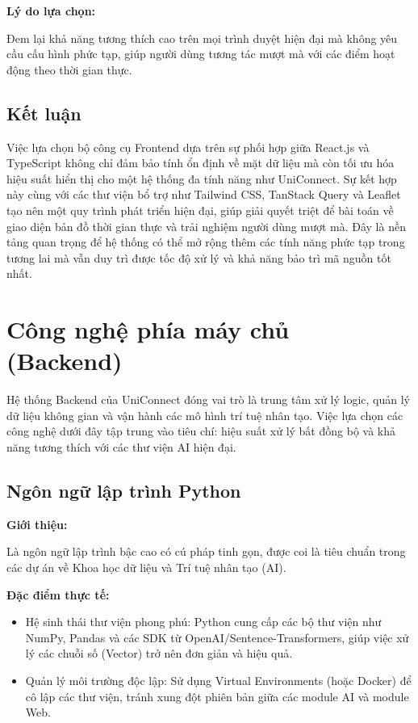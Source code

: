 \textbf{Lý do lựa chọn:}

Đem lại khả năng tương thích cao trên mọi trình duyệt hiện đại mà không yêu cầu cấu hình phức tạp, giúp người dùng tương tác mượt mà với các điểm hoạt động theo thời gian thực.

\subsection{Kết luận}

Việc lựa chọn bộ công cụ Frontend dựa trên sự phối hợp giữa React.js và TypeScript không chỉ đảm bảo tính ổn định về mặt dữ liệu mà còn tối ưu hóa hiệu suất hiển thị cho một hệ thống đa tính năng như UniConnect. Sự kết hợp này cùng với các thư viện bổ trợ như Tailwind CSS, TanStack Query và Leaflet tạo nên một quy trình phát triển hiện đại, giúp giải quyết triệt để bài toán về giao diện bản đồ thời gian thực và trải nghiệm người dùng mượt mà. Đây là nền tảng quan trọng để hệ thống có thể mở rộng thêm các tính năng phức tạp trong tương lai mà vẫn duy trì được tốc độ xử lý và khả năng bảo trì mã nguồn tốt nhất.

\section{Công nghệ phía máy chủ (Backend)}

Hệ thống Backend của UniConnect đóng vai trò là trung tâm xử lý logic, quản lý dữ liệu không gian và vận hành các mô hình trí tuệ nhân tạo. Việc lựa chọn các công nghệ dưới đây tập trung vào tiêu chí: hiệu suất xử lý bất đồng bộ và khả năng tương thích với các thư viện AI hiện đại.

\subsection{Ngôn ngữ lập trình Python}

\textbf{Giới thiệu:} 

Là ngôn ngữ lập trình bậc cao có cú pháp tinh gọn, được coi là tiêu chuẩn trong các dự án về Khoa học dữ liệu và Trí tuệ nhân tạo (AI)\cite{lubanovic2019introducing}.

\textbf{Đặc điểm thực tế:}

\begin{itemize}
    \item Hệ sinh thái thư viện phong phú: Python cung cấp các bộ thư viện như NumPy, Pandas và các SDK từ OpenAI/Sentence-Transformers, giúp việc xử lý các chuỗi số (Vector) trở nên đơn giản và hiệu quả.

    \item Quản lý môi trường độc lập: Sử dụng Virtual Environments (hoặc Docker) để cô lập các thư viện, tránh xung đột phiên bản giữa các module AI và module Web.
\end{itemize}

